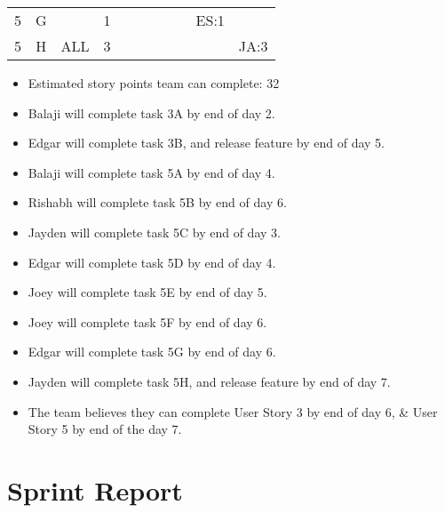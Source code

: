 \documentclass[12pt]{article}
\begin{document}
\begin{table}[H]
\begin{tabular}{@{}c|c|c|c|ccccccc@{}}
5     & G    &            & 1                                                      &                                                 &                                                 &                                                  &                                                  &                                                  & ES:1                                             &                                                  \\ 
5     & H    & ALL        & 3                                                      &                                                 &                                                 &                                                  &                                                  &                                                  &                                                  & JA:3                                             \\ \bottomrule
\end{tabular}
\end{table}

\begin{itemize}%
\item Estimated story points team can complete: 32
\item Balaji will complete task 3A by end of day 2.
\item Edgar will complete task 3B, and release feature by end of day 5.
\item Balaji will complete task 5A by end of day 4.
\item Rishabh will complete task 5B by end of day 6.
\item Jayden will complete task 5C by end of day 3.
\item Edgar will complete task 5D by end of day 4.
\item Joey will complete task 5E by end of day 5.
\item Joey will complete task 5F by end of day 6.
\item Edgar will complete task 5G by end of day 6.
\item Jayden will complete task 5H, and release feature by end of day 7.
\item The team believes they can complete User Story 3 by end of day 6, \& User Story 5 by end of the day 7. 
\end{itemize}

\newpage

\section{Sprint Report}
\end{document}

